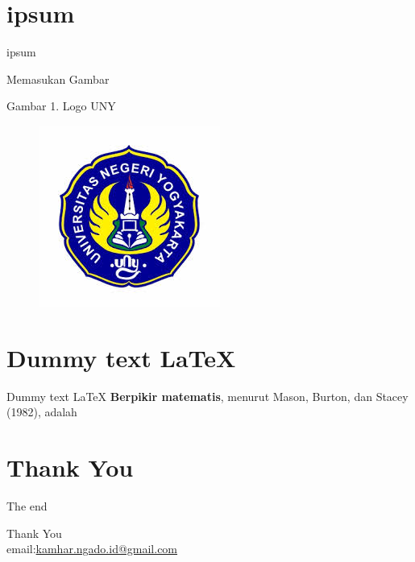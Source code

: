 \documentclass[compress,red]{beamer}
\begin{document}
	\section{ipsum}
	\begin{frame}[t] {ipsum}
	\lipsum [1]

	\end{frame}
	
	\begin{frame}[t]{Memasukan Gambar}
\begin{center}
	Gambar 1. Logo UNY
\end{center}	
	\begin{figure}
	\centering
	\includegraphics[width=0.3\linewidth]{uny}
	\label{fig:uny}
\end{figure}
\end{frame}

	\section{Dummy text \LaTeX}
	\begin{frame}[t] {Dummy text \LaTeX}
		  \textbf{Berpikir matematis}, menurut Mason, Burton, dan Stacey (1982), adalah \lipsum[2]
	\end{frame}

	\section{Thank You}
	\begin{frame}[t] {The end}
	\begin{center}
	\LARGE{Thank You}\\email:\underline{kamhar.ngado.id@gmail.com}
	\end{center}
	\end{frame}
\end{document}
